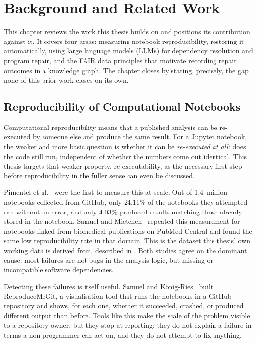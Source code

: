 \chapter{Background and Related Work}
\label{chap:related-work}

This chapter reviews the work this thesis builds on and positions its
contribution against it. It covers four areas: measuring notebook
reproducibility, restoring it automatically, using large language models
(LLMs) for dependency resolution and program repair, and the FAIR data
principles that motivate recording repair outcomes in a knowledge graph. The
chapter closes by stating, precisely, the gap none of this prior work closes
on its own.

\section{Reproducibility of Computational Notebooks}
\label{sec:rw-reproducibility}

Computational reproducibility means that a published analysis can be
re-executed by someone else and produce the same result. For a Jupyter
notebook, the weaker and more basic question is whether it can be
\emph{re-executed at all}: does the code still run, independent of whether
the numbers come out identical. This thesis targets that weaker property,
re-executability, as the necessary first step before reproducibility in the
fuller sense can even be discussed.

Pimentel et al.~\cite{pimentel2019msr} were the first to measure this at
scale. Out of 1.4~million notebooks collected from GitHub, only 24.11\% of
the notebooks they attempted ran without an error, and only 4.03\% produced
results matching those already stored in the notebook. Samuel and
Mietchen~\cite{samuel2024gigascience} repeated this measurement for
notebooks linked from biomedical publications on PubMed Central and found
the same low reproducibility rate in that domain. This is the dataset this
thesis' own working data is derived from, described in
. Both studies agree on the dominant cause: most
failures are not bugs in the analysis logic, but missing or incompatible
software dependencies.

Detecting these failures is itself useful. Samuel and
K{\"o}nig-Ries~\cite{samuel2020reproducemegit} built ReproduceMeGit, a
visualisation tool that runs the notebooks in a GitHub repository and shows,
for each one, whether it succeeded, crashed, or produced different output
than before. Tools like this make the scale of the problem visible to a
repository owner, but they stop at reporting: they do not explain a failure
in terms a non-programmer can act on, and they do not attempt to fix
anything.

